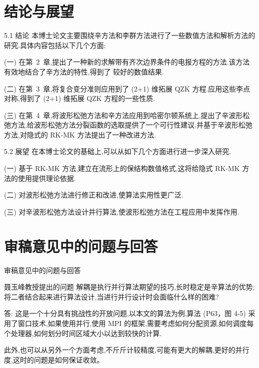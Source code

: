 \documentclass{beamer}
\begin{document}
\section{结论与展望}
\begin{frame}{5.1 结论}
\qquad 本博士论文主要围绕辛方法和李群方法进行了一些数值方法和解析方法的研究.具体内容包括以下几个方面:

(一) 在第~2~章,提出了一种新的求解带有齐次边界条件的电报方程的方法.该方法有效地结合了辛方法的特性,得到了
较好的数值结果.

(二) 在第~3~章,将复合变分准则应用到了 (2+1) 维拓展 QZK 方程.应用这些李点对称,得到了 (2+1) 维拓展 QZK 方程的一些性质.

(三) 在第~4~章,将波形松弛方法和辛方法应用到哈密尔顿系统上,提出了辛波形松弛方法,给波形松弛方法分裂函数的选取提供了一个可行性建议.并基于辛波形松弛方法,对隐式的 RK-MK 方法提出了一种改进方法.
\end{frame}

\begin{frame}{5.2 展望}
\qquad 在本博士论文的基础上,可以从如下几个方面进行进一步深入研究.

(一) 基于 RK-MK 方法,建立在流形上的保结构数值格式,这将给隐式 RK-MK 方法的使用提供理论依据.

(二) 对波形松弛方法进行修正和改进,使算法实用性更广泛.

(三) 对辛波形松弛方法设计并行算法,使波形松弛方法在工程应用中发挥作用.
\end{frame}

\section{审稿意见中的问题与回答}
\begin{frame}{审稿意见中的问题与回答}
\begin{block}{聂玉峰教授提出的问题}
解耦是执行并行算法期望的技巧,长时稳定是辛算法的优势;将二者结合起来进行算法设计,当进行并行设计时会面临什么样的困难?
\end{block}
答: 这是一个十分具有挑战性的开放问题,以本文的算法为例,算法 (P63，图 4-5) 采用了窗口技术,如果使用并行,使用 MPI 的框架,需要考虑如何分配资源,如何调度每个处理器,如何划分时间区域大小以达到较快的计算.

\qquad 此外,也可以从另外一个方面考虑,不斤斤计较精度,可能有更大的解耦,更好的并行度,这时的问题是如何保证收敛。
\end{frame}
\end{document}
